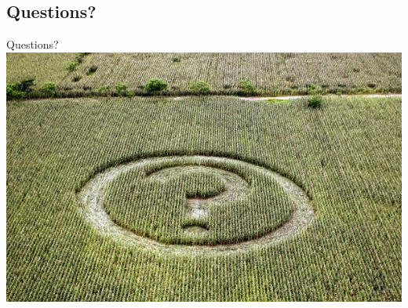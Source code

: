 \documentclass[screen, compress]{beamer}
\begin{document}
\subsection{Questions?}
\begin{frame}{Questions?}
\includegraphics[width=\textwidth]{img/any-questions}
\end{frame}
\end{document}
